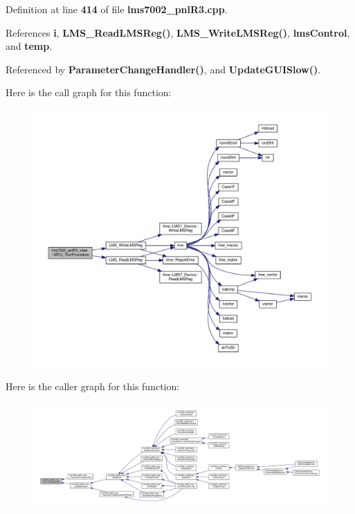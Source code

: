 Definition at line {\bf 414} of file {\bf lms7002\+\_\+pnl\+R3.\+cpp}.



References {\bf i}, {\bf L\+M\+S\+\_\+\+Read\+L\+M\+S\+Reg()}, {\bf L\+M\+S\+\_\+\+Write\+L\+M\+S\+Reg()}, {\bf lms\+Control}, and {\bf temp}.



Referenced by {\bf Parameter\+Change\+Handler()}, and {\bf Update\+G\+U\+I\+Slow()}.



Here is the call graph for this function\+:
\nopagebreak
\begin{figure}[H]
\begin{center}
\leavevmode
\includegraphics[width=350pt]{d5/d55/classlms7002__pnlR3__view_a1c983e4ac04f4292cf5fb1369af9c094_cgraph}
\end{center}
\end{figure}




Here is the caller graph for this function\+:
\nopagebreak
\begin{figure}[H]
\begin{center}
\leavevmode
\includegraphics[width=350pt]{d5/d55/classlms7002__pnlR3__view_a1c983e4ac04f4292cf5fb1369af9c094_icgraph}
\end{center}
\end{figure}


